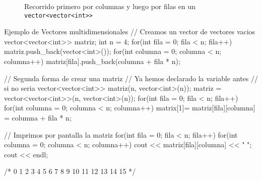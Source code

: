 \documentclass{article}
\begin{document}
    \begin{figure}[h]
        \centering
        \caption{Recorrido primero por columnas y luego por filas en un \texttt{vector<vector<int>>}}
    \end{figure}

    \begin{codelisting}{Ejemplo de Vectores multidimensionales}
// Creamos un vector de vectores vacios
vector<vector<int>> matriz;
int n = 4;
for(int fila = 0; fila < n; fila++) {
    matriz.push_back(vector<int>());
    for(int columna = 0; columna < n; columna++) {
        matriz[fila].push_back(columna + fila * n);
    }
}

// Segunda forma de crear una matriz
// Ya hemos declarado la variable antes
// si no seria vector<vector<int>> matriz(n, vector<int>(n));
matriz = vector<vector<int>>(n, vector<int>(n)); 
for(int fila = 0; fila < n; fila++) {
    for(int columna = 0; columna < n; columna++) {matrix[1]=
        matriz[fila][columna] = columna + fila * n;
    }
}

// Imprimos por pantalla la matriz
for(int fila = 0; fila < n; fila++) {
    for(int columna = 0; columna < n; columna++) {
        cout << matriz[fila][columna] << " ";
    }
    cout << endl;
}

/*
    0 1 2 3 
    4 5 6 7 
    8 9 10 11 
    12 13 14 15
*/
    \end{codelisting}
\end{document}
